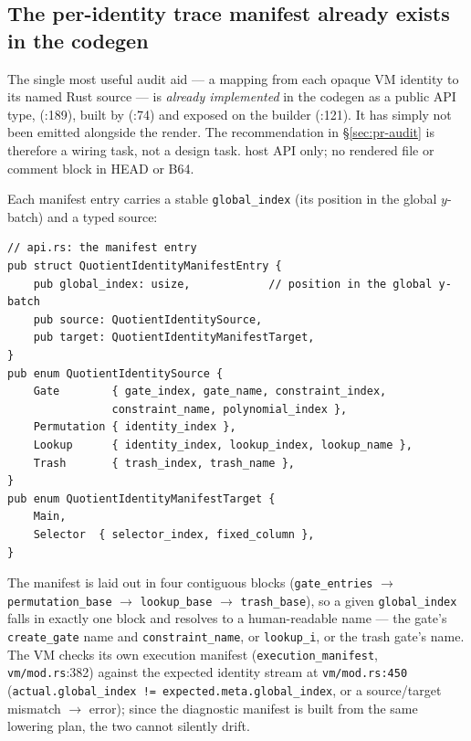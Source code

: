 \subsection{The per-identity trace manifest already exists in the codegen}
\label{sec:pr-trace-manifest}

The single most useful audit aid --- a mapping from each opaque VM
identity to its named Rust source --- is \emph{already implemented} in
the codegen as a public API type,
 (:189), built by
 (:74) and
exposed on the builder (:121). It has simply
not been emitted alongside the render. The recommendation in
\S\ref{sec:pr-audit} is therefore a wiring task, not a design task.
 host API only; no rendered file or comment block in
HEAD or B64.

Each manifest entry carries a stable \texttt{global\_index} (its
position in the global $y$-batch) and a typed source:
\begin{lstlisting}[style=rust]
// api.rs: the manifest entry
pub struct QuotientIdentityManifestEntry {
    pub global_index: usize,            // position in the global y-batch
    pub source: QuotientIdentitySource,
    pub target: QuotientIdentityManifestTarget,
}
pub enum QuotientIdentitySource {
    Gate        { gate_index, gate_name, constraint_index,
                constraint_name, polynomial_index },
    Permutation { identity_index },
    Lookup      { identity_index, lookup_index, lookup_name },
    Trash       { trash_index, trash_name },
}
pub enum QuotientIdentityManifestTarget {
    Main,
    Selector  { selector_index, fixed_column },
}
\end{lstlisting}

The manifest is laid out in four contiguous blocks
(\texttt{gate\_entries} $\to$ \texttt{permutation\_base} $\to$
\texttt{lookup\_base} $\to$ \texttt{trash\_base}), so a given
\texttt{global\_index} falls in exactly one block and resolves to a
human-readable name --- the gate's \texttt{create\_gate} name and
\texttt{constraint\_name}, or \texttt{lookup\_i}, or the trash
gate's name. The VM checks its own execution manifest
(\texttt{execution\_\allowbreak{}manifest}, \texttt{vm/mod.rs}:382) against the
expected identity stream at \texttt{vm/mod.rs:450}
(\texttt{actual.global\_\allowbreak{}index != expected.meta.global\_\allowbreak{}index}, or a
source/target mismatch $\to$ error); since the diagnostic manifest is
built from the same lowering plan, the two cannot silently drift.

